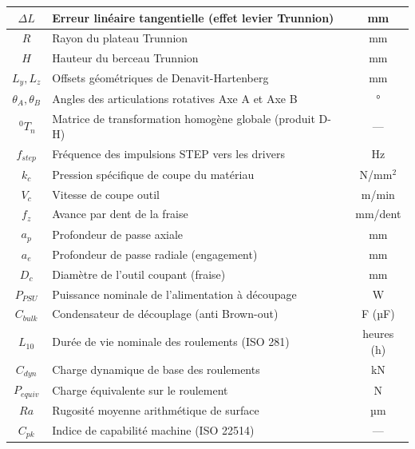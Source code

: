 \begin{center}
\begin{tabular}{|c|p{8cm}|c|}
\hline
$\Delta L$ & Erreur linéaire tangentielle (effet levier Trunnion) & mm \\
\hline
$R$ & Rayon du plateau Trunnion & mm \\
\hline
$H$ & Hauteur du berceau Trunnion & mm \\
\hline
$L_y, L_z$ & Offsets géométriques de Denavit-Hartenberg & mm \\
\hline
$\theta_A, \theta_B$ & Angles des articulations rotatives Axe A et Axe B & ° \\
\hline
$\,^0T_n$ & Matrice de transformation homogène globale (produit D-H) & --- \\
\hline
$f_{step}$ & Fréquence des impulsions STEP vers les drivers & Hz \\
\hline
$k_c$ & Pression spécifique de coupe du matériau & N/mm$^2$ \\
\hline
$V_c$ & Vitesse de coupe outil & m/min \\
\hline
$f_z$ & Avance par dent de la fraise & mm/dent \\
\hline
$a_p$ & Profondeur de passe axiale & mm \\
\hline
$a_e$ & Profondeur de passe radiale (engagement) & mm \\
\hline
$D_c$ & Diamètre de l'outil coupant (fraise) & mm \\
\hline
$P_{PSU}$ & Puissance nominale de l'alimentation à découpage & W \\
\hline
$C_{bulk}$ & Condensateur de découplage (anti Brown-out) & F (µF) \\
\hline
$L_{10}$ & Durée de vie nominale des roulements (ISO 281) & heures (h) \\
\hline
$C_{dyn}$ & Charge dynamique de base des roulements & kN \\
\hline
$P_{equiv}$ & Charge équivalente sur le roulement & N \\
\hline
$Ra$ & Rugosité moyenne arithmétique de surface & µm \\
\hline
$C_{pk}$ & Indice de capabilité machine (ISO 22514) & --- \\
\hline
\end{tabular}
\end{center}
